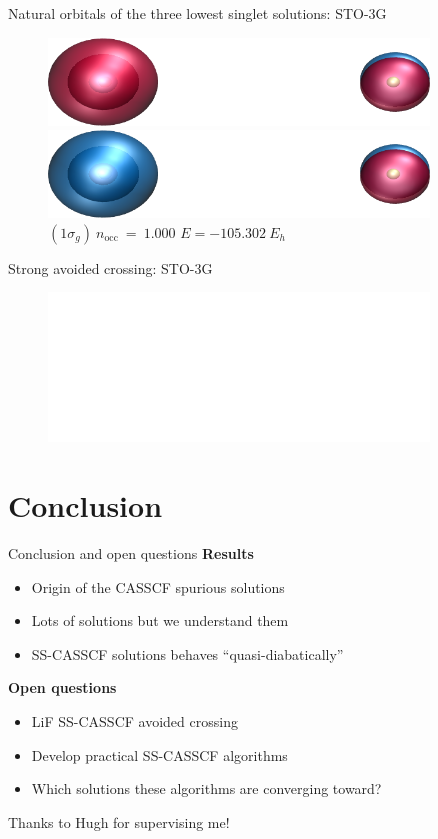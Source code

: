 \documentclass[10pt]{beamer}
\begin{document}
\begin{frame}{Natural orbitals of the three lowest singlet solutions:  STO-3G}
\begin{figure}
\begin{columns}[b]
      \begin{column}{0.31\textwidth}
        \includegraphics[width=0.9\textwidth]{Figures/lifr12_s2_mo7.cube.png}
        \caption*{\centering $(2\sigma_u)~n_\text{occ}~=~1.000$}
        \includegraphics[width=0.9\textwidth]{Figures/lifr12_s2_mo6.cube.png}
        \caption*{\centering $(1\sigma_g)~n_\text{occ}~=~1.000$
        $E=-105.302~E_h$}
      \end{column}

    \end{columns}
  \end{figure}
\end{frame}

\begin{frame}{Strong avoided crossing:  STO-3G}
  \begin{figure}
    \includegraphics<1>[width=0.9\textwidth]{Figures/fig_9c.pdf}
  \end{figure}
\end{frame}

\section{Conclusion}

\begin{frame}{Conclusion and open questions}
  \pause[1]
  \textbf{Results}
  \begin{itemize}[<+- | alert@+>]
  \item Origin of the CASSCF spurious solutions
  \item Lots of solutions but we understand them
  \item SS-CASSCF solutions behaves ``quasi-diabatically''
  \end{itemize}
  \pause[4]
  \textbf{Open questions}
  \begin{itemize}[<+- | alert@+>]
  \item LiF SS-CASSCF avoided crossing 
  \item Develop practical SS-CASSCF algorithms
  \item Which solutions these algorithms are converging toward?
  \end{itemize}
  \pause[7]
  \alert{Thanks to Hugh for supervising me!}
\end{frame}
\end{document}
